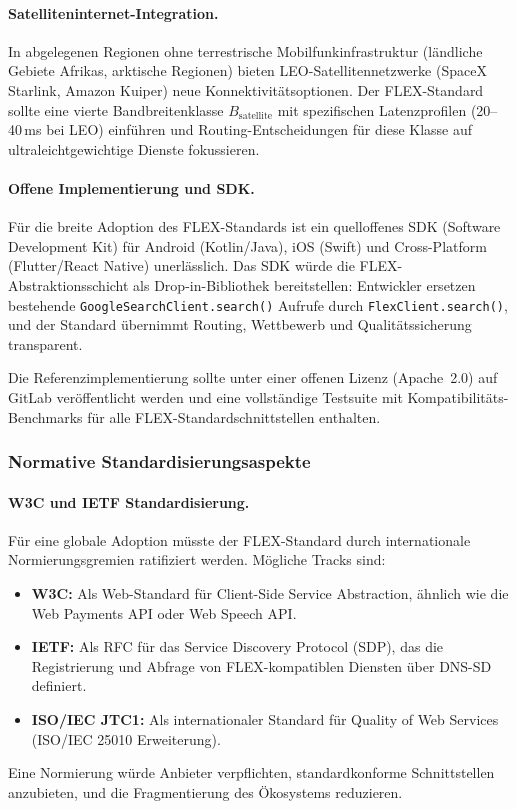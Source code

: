 ﻿\documentclass[a4paper,12pt]{article}
\theoremstyle{definition}
\begin{document}
\paragraph{Satelliteninternet-Integration.}
In abgelegenen Regionen ohne terrestrische Mobilfunkinfrastruktur (ländliche Gebiete Afrikas, arktische Regionen) bieten LEO-Satellitennetzwerke (SpaceX Starlink, Amazon Kuiper) neue Konnektivitätsoptionen. Der FLEX-Standard sollte eine vierte Bandbreitenklasse $B_\mathrm{satellite}$ mit spezifischen Latenzprofilen (20--40\,ms bei LEO) einführen und Routing-Entscheidungen für diese Klasse auf ultraleichtgewichtige Dienste fokussieren.

\paragraph{Offene Implementierung und SDK.}
Für die breite Adoption des FLEX-Standards ist ein quelloffenes SDK (Software Development Kit) für Android (Kotlin/Java), iOS (Swift) und Cross-Platform (Flutter/React Native) unerlässlich. Das SDK würde die FLEX-Abstraktionsschicht als Drop-in-Bibliothek bereitstellen: Entwickler ersetzen bestehende \texttt{GoogleSearchClient.search()} Aufrufe durch \texttt{FlexClient.search()}, und der Standard übernimmt Routing, Wettbewerb und Qualitätssicherung transparent.

Die Referenzimplementierung sollte unter einer offenen Lizenz (Apache~2.0) auf GitLab veröffentlicht werden und eine vollständige Testsuite mit Kompatibilitäts-Benchmarks für alle FLEX-Standardschnittstellen enthalten.

\subsubsection{Normative Standardisierungsaspekte}

\paragraph{W3C und IETF Standardisierung.}
Für eine globale Adoption müsste der FLEX-Standard durch internationale Normierungsgremien ratifiziert werden. Mögliche Tracks sind:
\begin{itemize}
    \item \textbf{W3C:} Als Web-Standard für Client-Side Service Abstraction, ähnlich wie die Web Payments API oder Web Speech API.
    \item \textbf{IETF:} Als RFC für das Service Discovery Protocol (SDP), das die Registrierung und Abfrage von FLEX-kompatiblen Diensten über DNS-SD definiert.
    \item \textbf{ISO/IEC JTC1:} Als internationaler Standard für Quality of Web Services (ISO/IEC 25010 Erweiterung).
\end{itemize}
Eine Normierung würde Anbieter verpflichten, standardkonforme Schnittstellen anzubieten, und die Fragmentierung des Ökosystems reduzieren.
\end{document}
